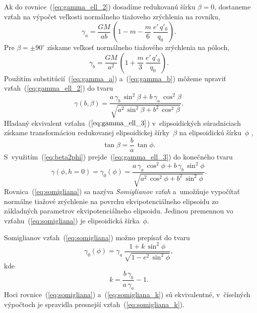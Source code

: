 \documentclass[a4paper, 12pt]{book}
\begin{document}
Ak do rovnice~(\ref{eq:gamma_ell_2}) dosadíme redukovanú šírku $\beta = 0$, 
dostaneme vzťah na výpočet veľkosti normálneho tiažoveho zrýchlenia na rovníku,
%
\begin{equation}
\label{eq:gamma_a}
\gamma_a = \frac{GM}{ab} \, \left( 1 - m - \frac{m}{6} \, \frac{e' \, 
q'_0}{q_0} \right){.}
\end{equation}
%
Pre $\beta = \pm 90^\circ$ získame veľkosť normálneho tiažového zrýchlenia na 
póloch,
%
\begin{equation}
\label{eq:gamma_b}
\gamma_b = \frac{GM}{a^2} \, \left( 1 + \frac{m}{3} \, \frac{e' \, q'_0}{q_0} 
\right){.}
\end{equation}
%
Použitím substitúcií~(\ref{eq:gamma_a}) a~(\ref{eq:gamma_b}) môžeme upraviť 
vzťah~(\ref{eq:gamma_ell_2}) do tvaru
%
\begin{equation}
\label{eq:gamma_ell_3}
\gamma(b, \beta) = \frac{a \, \gamma_b \, \sin^2\beta + b \, \gamma_a \, 
\cos^2\beta}{\sqrt{a^2 \, \sin^2\beta + b^2 \, \cos^2\beta}}{.}
\end{equation}
%
Hľadaný ekvivalent vzťahu~($\ref{eq:gamma_ell_3}$) v~elipsoidických 
súradniciach získame transformáciou redukovanej elipsoidickej šírky~$\beta$ na 
elipsoidickú šírku~$\phi$ \parencite[napríklad][]{MoritzPhysicalGeodesy},
%
\begin{equation}
\label{eq:beta2phi}
\tan \beta = \frac{b}{a} \, \tan\phi{.}
\end{equation}
%
S~využitím~(\ref{eq:beta2phi}) prejde~(\ref{eq:gamma_ell_3}) do konečného tvaru
%
\begin{equation}
\label{eq:somigliana}
\gamma(\phi, h = 0) = \gamma_0(\phi) = \frac{a \, \gamma_a \, \cos^2\phi + b \, 
\gamma_b \, \sin^2\phi}{\sqrt{a^2 \, \cos^2\phi + b^2 \, \sin^2\phi}}{.}
\end{equation}
%
Rovnica~(\ref{eq:somigliana}) sa nazýva \emph{Somiglianov vzťah} a~umožňuje 
vypočítať normálne tiažové zrýchlenie na povrchu ekvipotenciálneho elipsoidu zo 
základných parametrov ekvipotenciálneho elipsoidu.  Jedinou premennou vo 
vzťahu~(\ref{eq:somigliana}) je elipsoidická šírka~$\phi$.

Somiglianov vzťah~(\ref{eq:somigliana}) možno prepísať do tvaru 
\parencite{GRS80}
%
\begin{equation}
\label{eq:somigliana_k}
\gamma_0(\phi) = \gamma_a \, \frac{1 + k \, \sin^2\phi}{\sqrt{1 - e^2 \, 
\sin^2\phi}}{,}
\end{equation}
%
kde
%
\begin{equation}
k = \frac{b \, \gamma_b}{a \, \gamma_a} - 1{.}
\end{equation}
%
Hoci rovnice~(\ref{eq:somigliana}) a~(\ref{eq:somigliana_k}) sú ekvivalentné, 
v~číselných výpočtoch je spravidla presnejší vzťah~(\ref{eq:somigliana_k}).
\end{document}
